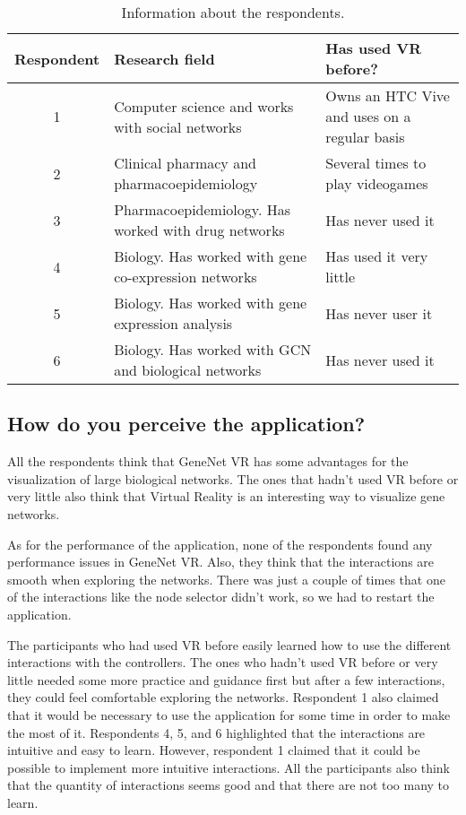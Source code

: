 \begin{table}[h!]
\centering
\begin{tabularx}{\textwidth}{c X X}
\hline
Respondent & Research field & Has used VR before? \\
\hline
1 & Computer science and works with social networks  & Owns an HTC Vive and uses on a regular basis \\
2 & Clinical pharmacy and pharmacoepidemiology & Several times to play videogames \\
3 & Pharmacoepidemiology. Has worked with drug networks & Has never used it \\
4 & Biology. Has worked with gene co-expression networks & Has used it very little \\
5 & Biology. Has worked with gene expression analysis & Has never user it \\
6 & Biology. Has worked with GCN and biological networks & Has never used it \\
\hline
\end{tabularx}
\caption{Information about the respondents.}
\label{tab:respondents}
\end{table}

\subsection{How do you perceive the application?}
All the respondents think that GeneNet VR has some advantages for the visualization of large biological networks. The ones that hadn't used VR before or very little also think that Virtual Reality is an interesting way to visualize gene networks.

As for the performance of the application, none of the respondents found any performance issues in GeneNet VR. Also, they think that the interactions are smooth when exploring the networks. There was just a couple of times that one of the interactions like the node selector didn't work, so we had to restart the application.

The participants who had used VR before easily learned how to use the different interactions with the controllers. The ones who hadn't used VR before or very little needed some more practice and guidance first but after a few interactions, they could feel comfortable exploring the networks. Respondent 1 also claimed that it would be necessary to use the application for some time in order to make the most of it. Respondents 4, 5, and 6 highlighted that the interactions are intuitive and easy to learn. However, respondent 1 claimed that it could be possible to implement more intuitive interactions. All the participants also think that the quantity of interactions seems good and that there are not too many to learn.

